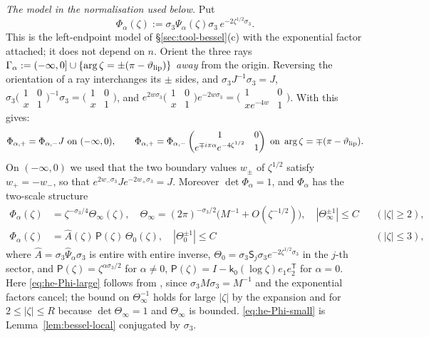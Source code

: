 \emph{The model in the normalisation used below.} Put
\begin{equation}\label{eq:he-Phi}
  \Phi_\alpha(\zeta):=\sigma_3\Psi_\alpha(\zeta)\sigma_3\,e^{-2\zeta^{1/2}\sigma_3}.
\end{equation}
This is the left-endpoint model of \S\ref{sec:tool-bessel}(c) with the exponential factor attached; it does not depend on $n$.
Orient the three rays $\Gamma_\alpha:=(-\infty,0]\cup\{\arg\zeta=\pm(\pi-\vartheta_{\mathrm{lip}})\}$ \emph{away} from the origin.
Reversing the orientation of a ray interchanges its $\pm$ sides, and $\sigma_3J^{-1}\sigma_3=J$,
$\sigma_3\bigl(\begin{smallmatrix}1&0\\x&1\end{smallmatrix}\bigr)^{-1}\sigma_3=\bigl(\begin{smallmatrix}1&0\\x&1\end{smallmatrix}\bigr)$,
and $e^{2w\sigma_3}\bigl(\begin{smallmatrix}1&0\\x&1\end{smallmatrix}\bigr)e^{-2w\sigma_3}
=\bigl(\begin{smallmatrix}1&0\\xe^{-4w}&1\end{smallmatrix}\bigr)$. With \cite[(6.16)--(6.18)]{KMVV} this gives:
\begin{equation}\label{eq:he-Phi-jumps}
  \Phi_{\alpha,+}=\Phi_{\alpha,-}J\ \text{on }(-\infty,0),\qquad
  \Phi_{\alpha,+}=\Phi_{\alpha,-}\begin{pmatrix}1&0\\e^{\mp i\pi\alpha}e^{-4\zeta^{1/2}}&1\end{pmatrix}\ \text{on }
  \arg\zeta=\mp(\pi-\vartheta_{\mathrm{lip}}).
\end{equation}
On $(-\infty,0)$ we used that the two boundary values $w_\pm$ of $\zeta^{1/2}$ satisfy $w_+=-w_-$, so that
$e^{2w_-\sigma_3}Je^{-2w_+\sigma_3}=J$. Moreover $\det\Phi_\alpha=1$, and $\Phi_\alpha$ has the two-scale structure
\begin{align}
  \Phi_\alpha(\zeta)&=\zeta^{-\sigma_3/4}\Theta_\infty(\zeta),\quad
  \Theta_\infty=(2\pi)^{-\sigma_3/2}\bigl(M^{-1}+O(\zeta^{-1/2})\bigr),\quad |\Theta_\infty^{\pm1}|\le C
  &&(|\zeta|\ge2),\label{eq:he-Phi-large}\\
  \Phi_\alpha(\zeta)&=\hat A(\zeta)\,\mathsf P(\zeta)\,\Theta_0(\zeta),\quad |\Theta_0^{\pm1}|\le C
  &&(|\zeta|\le3),\label{eq:he-Phi-small}
\end{align}
where $\hat A=\sigma_3\hat\Psi_\alpha\sigma_3$ is entire with entire inverse, $\Theta_0=\sigma_3\mathsf S_j\sigma_3
e^{-2\zeta^{1/2}\sigma_3}$ in the $j$-th sector, and $\mathsf P(\zeta)=\zeta^{\alpha\sigma_3/2}$ for $\alpha\ne0$,
$\mathsf P(\zeta)=I-\mathsf k_0(\log\zeta)e_1e_2^{\mathsf T}$ for $\alpha=0$. Here \eqref{eq:he-Phi-large} follows from
\cite[(6.28)]{KMVV}, since $\sigma_3M\sigma_3=M^{-1}$ and the exponential factors cancel; the bound on $\Theta_\infty^{-1}$ holds for
large $|\zeta|$ by the expansion and for $2\le|\zeta|\le R$ because $\det\Theta_\infty=1$ and $\Theta_\infty$ is
bounded. \eqref{eq:he-Phi-small} is Lemma~\ref{lem:bessel-local} conjugated by $\sigma_3$.

